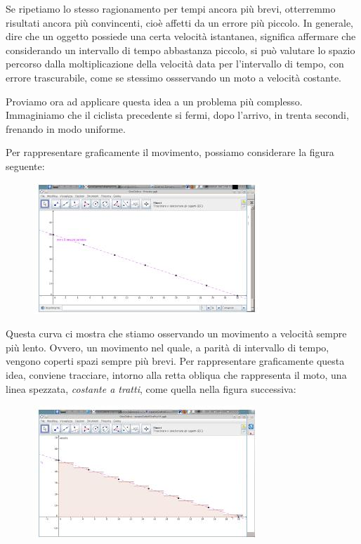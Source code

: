 Se ripetiamo lo stesso ragionamento per tempi ancora più brevi, otterremmo risultati ancora più convincenti, cioè affetti da un errore più piccolo. In generale, dire che un oggetto possiede una certa velocità istantanea, significa affermare che considerando un intervallo di tempo abbastanza piccolo, si può valutare lo spazio percorso dalla moltiplicazione della velocità data per l’intervallo di tempo, con errore trascurabile, come se stessimo ossservando un moto a velocità costante.

Proviamo ora ad applicare questa idea a un problema più complesso. Immaginiamo che il ciclista precedente si fermi, dopo l’arrivo, in trenta secondi, frenando in modo uniforme.

Per rappresentare graficamente il movimento, possiamo considerare la figura seguente:

\begin{figure}[H]
 \centering
 \includegraphics[width=.7\textwidth]{../immagini/frenataUniforme.jpeg}
\end{figure}

Questa curva ci mostra che stiamo osservando un movimento a velocità sempre più lento. Ovvero, un movimento nel quale, a parità di intervallo di tempo, vengono coperti spazi sempre più brevi. Per rappresentare graficamente questa idea, conviene tracciare, intorno alla retta obliqua che rappresenta il moto, una linea spezzata, {\slshape costante a tratti}, come quella nella figura successiva:

\begin{figure}[H]
 \centering
 \includegraphics[width=.7\textwidth]{../immagini/scaletta.jpeg}
\end{figure}

